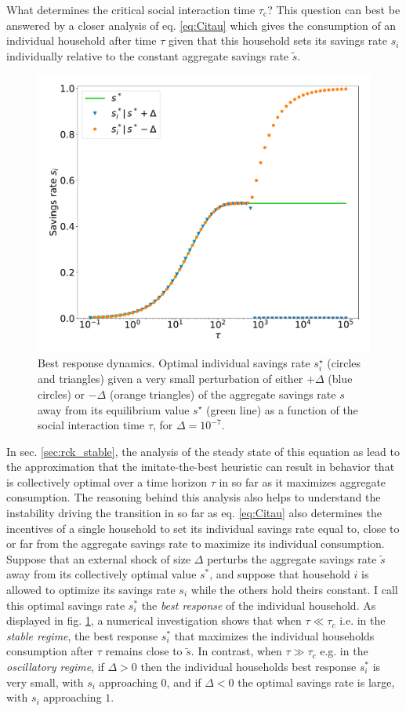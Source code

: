 What determines the critical social interaction time $\tau_\mathrm{c}$?
This question can best be answered by a closer analysis of eq. \eqref{eq:Citau} which gives the consumption of an individual household after time $\tau$ given that this household sets its savings rate $s_i$ individually relative to the constant aggregate savings rate $\tilde{s}$. 
\begin{figure}
  \centering
  \hspace{-1.5cm}\includegraphics[width = .7 \textwidth]{figures/best_response.pdf}
  \caption{Best response dynamics. Optimal individual savings rate $s_i^\star$ (circles and triangles) given a very small perturbation of either $+\Delta$ (blue circles) or $-\Delta$ (orange triangles) of the aggregate savings rate $s$ away from its equilibrium value $s^\star$ (green line) as a function of the social interaction time $\tau$, for $\Delta = 10^{-7}$.}\hspace{.5cm}
  \label{fig:best_response}
\end{figure}

In sec. \ref{sec:rck_stable}, the analysis of the steady state of this equation as lead to the approximation that the imitate-the-best heuristic can result in behavior that is collectively optimal over a time horizon $\tau$ in so far as it maximizes aggregate consumption. 
The reasoning behind this analysis also helps to understand the instability driving the transition in so far as eq. \eqref{eq:Citau} also determines the incentives of a single household to set its individual savings rate equal to, close to or far from the aggregate savings rate to maximize its individual consumption. 
Suppose that an external shock of size $\Delta$ perturbs the aggregate savings rate $\tilde{s}$ away from its collectively optimal value $s^\ast$, and suppose that household $i$ is allowed to optimize its savings rate $s_i$ while the others hold theirs constant. 
I call this optimal savings rate $s^*_i$ the \emph{best response} of the individual household. 
As displayed in fig. \ref{fig:best_response}, a numerical investigation shows that when $\tau \ll \tau_{c}$ i.e. in the \emph{stable regime}, the best response $s^*_i$ that maximizes the individual households consumption after $\tau$ remains close to $\tilde{s}$. 
In contrast, when  $\tau \gg \tau_{c}$ e.g. in the \emph{oscillatory regime}, if $\Delta > 0$ then the individual households best response $s^*_i$ is very small, with $s_i$ approaching $0$, and if $\Delta < 0$ the optimal savings rate is large, with $s_i$ approaching $1$. 


